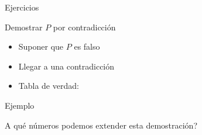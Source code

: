 \documentclass[14pt,aspectratio=169,xcolor=dvipsnames]{beamer}
\begin{document}
\begin{frame}{Ejercicios}
    \begin{center}

    \end{center}
\end{frame}
\begin{frame}{Demostrar $P$ por contradicción}
    \begin{itemize}
        \item<1-> Suponer que $P$ es falso
        \item<2-> Llegar a una contradicción
        \item<3-> Tabla de verdad:
    \end{itemize}
\end{frame}
\begin{frame}{Ejemplo}

    \begin{center}
    \end{center}

    \pause A qué números podemos extender esta demostración? 
\end{frame}
\end{document}
